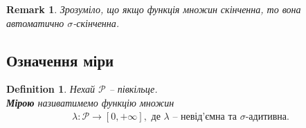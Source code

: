 \documentclass[a4paper, 10pt]{article}
\theoremstyle{theoremdd}
\newtheorem{definition}[theorem]{Definition}
\newtheorem{remark}[theorem]{Remark}
\begin{document}
\begin{remark}
Зрозуміло, що якщо функція множин скінченна, то вона автоматично $\sigma$-скінченна.
\end{remark}

\subsection{Означення міри}
\begin{definition}
Нехай $\mathcal{P}$ -- півкільце.\\
\textbf{Мірою} називатимемо функцію множин
\begin{align*}
\lambda \colon \mathcal{P} \to [0,+\infty], \text{ де } \lambda \text{ -- невід'ємна та $\sigma$-адитивна.}
\end{align*}
\end{definition}
\end{document}

